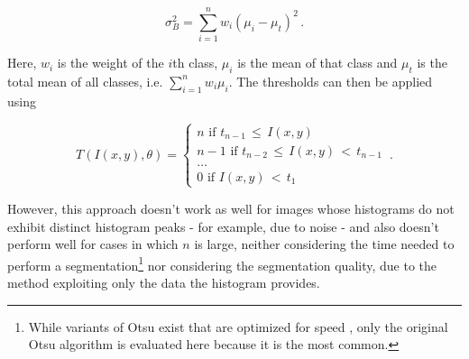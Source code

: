 \[ \sigma_B^2 = \sum \limits_{i=1}^{n} w_i (\mu_i - \mu_t)^2 \,. \]

\noindent Here, $w_i$ is the weight of the $i$th class, $\mu_i$ is the mean of that class and $\mu_t$ is the total mean of all classes, i.e. $\sum_{i=1}^{n} w_i \mu_i$. The thresholds can then be applied using

\[ T(I(x, y), \theta) =  \begin{cases}
				n \text{ if } t_{n-1} \, \leq \, I(x, y) \\
				n-1 \text { if } t_{n-2} \, \leq \, I(x, y) \, <  \, t_{n-1}\\
				\dots\\
			           0 \text{ if } I(x, y) \, < \, t_1
			     \end{cases}\,.
\]

\noindent However, this approach doesn't work as well for images whose histograms do not exhibit distinct histogram peaks - for example, due to noise - and also doesn't perform well for cases in which $n$ is large, neither considering the time needed to perform a segmentation\footnote{While variants of Otsu exist that are optimized for speed \cite{otsu_fast}, only the original Otsu algorithm is evaluated here because it is the most common.} nor considering the segmentation quality, due to the method exploiting only the data the histogram provides.





